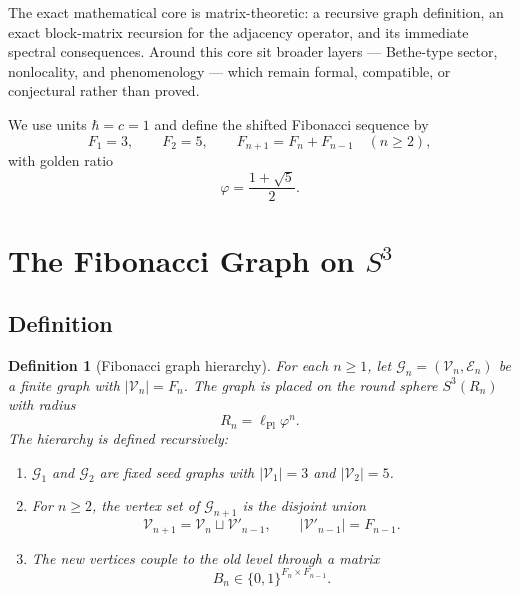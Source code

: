 \documentclass[
  aps,
  prd,
  reprint,
  superscriptaddress,
  nofootinbib,
  longbibliography,
  amsmath,
  amssymb
]{revtex4-2}
\newtheorem{definition}{Definition}
\theoremstyle{remark}
\newcommand{\Sthree}{S^{3}}
\newcommand{\lPl}{\ell_{\mathrm{Pl}}}
\newcommand{\phig}{\varphi}
\newcommand{\Gn}{\mathcal{G}_{n}}
\newcommand{\Vn}{\mathcal{V}_{n}}
\newcommand{\En}{\mathcal{E}_{n}}
\begin{document}
The exact mathematical core is matrix-theoretic: a recursive graph definition, an exact block-matrix recursion for the adjacency operator, and its immediate spectral consequences. Around this core sit broader layers --- Bethe-type sector, nonlocality, and phenomenology --- which remain formal, compatible, or conjectural rather than proved.

We use units $\hbar=c=1$ and define the shifted Fibonacci sequence by
\begin{equation}
F_1=3,
\qquad
F_2=5,
\qquad
F_{n+1}=F_n+F_{n-1}
\quad (n\ge 2),
\label{eq:fibrec}
\end{equation}
with golden ratio
\begin{equation}
\phig=\frac{1+\sqrt5}{2}.
\label{eq:phi}
\end{equation}

\section{The Fibonacci Graph on \texorpdfstring{$S^3$}{S3}}
\label{sec:graph}

\subsection{Definition}

\begin{definition}[Fibonacci graph hierarchy]
\label{def:graph}
For each $n\ge 1$, let $\Gn=(\Vn,\En)$ be a finite graph with $|\Vn|=F_n$. The graph is placed on the round sphere $\Sthree(R_n)$ with radius
\begin{equation}
R_n=\lPl\phig^n.
\label{eq:radius}
\end{equation}
The hierarchy is defined recursively:
\begin{enumerate}
    \item $\mathcal G_1$ and $\mathcal G_2$ are fixed seed graphs with $|\mathcal V_1|=3$ and $|\mathcal V_2|=5$.
    \item For $n\ge 2$, the vertex set of $\mathcal G_{n+1}$ is the disjoint union
    \begin{equation}
    \mathcal V_{n+1}=\mathcal V_n\sqcup \mathcal V'_{n-1},
    \qquad
    |\mathcal V'_{n-1}|=F_{n-1}.
    \label{eq:vertexsplit}
    \end{equation}
    \item The new vertices couple to the old level through a matrix
    \begin{equation}
    B_n\in\{0,1\}^{F_n\times F_{n-1}}.
    \end{equation}
\end{enumerate}
\end{definition}
\end{document}
